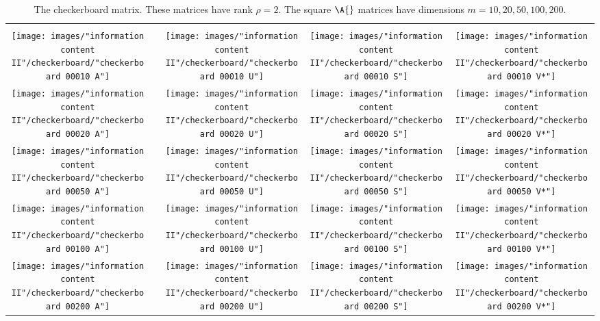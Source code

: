 \begin{table}[htdp]
\caption[The checkerboard matrix]{The checkerboard matrix. These matrices have rank $\rho = 2$. The square $\A{}$ matrices have dimensions $m=10,20,50,100,200$.}
\begin{center}
\begin{tabular}{ccccc}
%
 \svdi{} \\
%
 \texttt{[image: images/"information content II"/checkerboard/"checkerboard 00010 A"]} &&
 \texttt{[image: images/"information content II"/checkerboard/"checkerboard 00010 U"]} &
 \texttt{[image: images/"information content II"/checkerboard/"checkerboard 00010 S"]} &
 \texttt{[image: images/"information content II"/checkerboard/"checkerboard 00010 V*"]} \\
%
 \texttt{[image: images/"information content II"/checkerboard/"checkerboard 00020 A"]} &&
 \texttt{[image: images/"information content II"/checkerboard/"checkerboard 00020 U"]} &
 \texttt{[image: images/"information content II"/checkerboard/"checkerboard 00020 S"]} &
 \texttt{[image: images/"information content II"/checkerboard/"checkerboard 00020 V*"]} \\
%
 \texttt{[image: images/"information content II"/checkerboard/"checkerboard 00050 A"]} &&
 \texttt{[image: images/"information content II"/checkerboard/"checkerboard 00050 U"]} &
 \texttt{[image: images/"information content II"/checkerboard/"checkerboard 00050 S"]} &
 \texttt{[image: images/"information content II"/checkerboard/"checkerboard 00050 V*"]} \\
%
 \texttt{[image: images/"information content II"/checkerboard/"checkerboard 00100 A"]} &&
 \texttt{[image: images/"information content II"/checkerboard/"checkerboard 00100 U"]} &
 \texttt{[image: images/"information content II"/checkerboard/"checkerboard 00100 S"]} &
 \texttt{[image: images/"information content II"/checkerboard/"checkerboard 00100 V*"]} \\
%
 \texttt{[image: images/"information content II"/checkerboard/"checkerboard 00200 A"]} &&
 \texttt{[image: images/"information content II"/checkerboard/"checkerboard 00200 U"]} &
 \texttt{[image: images/"information content II"/checkerboard/"checkerboard 00200 S"]} &
 \texttt{[image: images/"information content II"/checkerboard/"checkerboard 00200 V*"]} \\
%
\end{tabular}
\end{center}
\label{tab:info content II:checkboard}
\end{table}%


\endinput